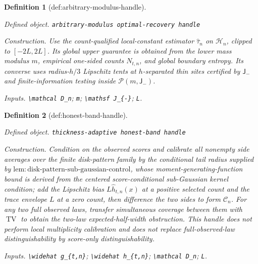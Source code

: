 \documentclass{article}
\newtheorem{definition}{Definition}
\begin{document}
\begin{definition}[def:arbitrary-modulus-handle]\label{def:arbitrary-modulus-handle}
\par\smallskip\noindent\emph{Defined object.} \texttt{arbitrary-\allowbreak{}modulus optimal-\allowbreak{}recovery handle}
\par\smallskip\noindent\emph{Construction.} Use the count-qualified local-constant estimator \(\widehat\tau_n\) on \(\mathcal H_n\), clipped to \([-2L,2L]\). Its global upper guarantee is obtained from the lower mass modulus \(m\), empirical one-sided counts \(N_{t,n}\), and global boundary entropy. Its converse uses radius-\(h/3\) Lipschitz tents at \(h\)-separated thin sites certified by \(\mathsf J_{-}\) and finite-information testing inside \(\mathcal P(m,\mathsf J_{-})\).
\par\smallskip\noindent\emph{Inputs.} \texttt{\textbackslash{}\allowbreak{}mathcal D\_\allowbreak{}n}; \texttt{m}; \texttt{\textbackslash{}\allowbreak{}mathsf J\_\allowbreak{}\{-\allowbreak{}\}\allowbreak{}}; \texttt{L}.
\end{definition}

\begin{definition}[def:honest-band-handle]\label{def:honest-band-handle}
\par\smallskip\noindent\emph{Defined object.} \texttt{thickness-\allowbreak{}adaptive honest-\allowbreak{}band handle}
\par\smallskip\noindent\emph{Construction.} Condition on the observed scores and calibrate all nonempty side averages over the finite disk-pattern family by the conditional tail radius supplied by \(\mathrm{lem:disk\text{-}pattern\text{-}sub\text{-}gaussian\text{-}control}\), whose moment-generating-function bound is derived from the centered score-conditional sub-Gaussian kernel condition; add the Lipschitz bias \(L\widehat h_{t,n}(x)\) at a positive selected count and the trace envelope \(L\) at a zero count, then difference the two sides to form \(\mathcal C_n\). For any two full observed laws, transfer simultaneous coverage between them with \(\operatorname{TV}\) to obtain the two-law expected-half-width obstruction. This handle does not perform local multiplicity calibration and does not replace full-observed-law distinguishability by score-only distinguishability.
\par\smallskip\noindent\emph{Inputs.} \texttt{\textbackslash{}\allowbreak{}widehat g\_\allowbreak{}\{t,\allowbreak{}n\}\allowbreak{}}; \texttt{\textbackslash{}\allowbreak{}widehat h\_\allowbreak{}\{t,\allowbreak{}n\}\allowbreak{}}; \texttt{\textbackslash{}\allowbreak{}mathcal D\_\allowbreak{}n}; \texttt{L}.
\end{definition}
\end{document}
